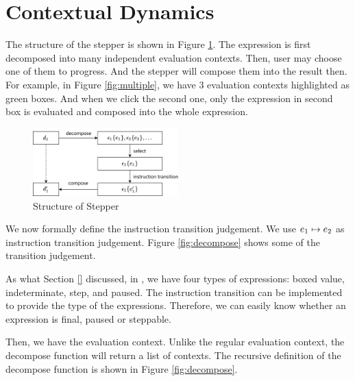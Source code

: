 \section{Contextual Dynamics}
\label{sec:condy}


The structure of the stepper is shown in Figure \ref{fig:structure}. The expression is first decomposed into many independent evaluation contexts. Then, user may choose one of them to progress. And the stepper will compose them into the result then. For example, in Figure \ref{fig:multiple}, we have 3 evaluation contexts highlighted as green boxes. And when we click the second one, only the expression in second box is evaluated and composed into the whole expression.

\begin{figure}[htbp]
  \centering
  \includegraphics[width=0.5\textwidth]{img/struct.png}
  \caption{Structure of Stepper}
  \label{fig:structure}
\end{figure}

We now formally define the instruction transition judgement. We use $e_1 \mapsto e_2$ as instruction transition judgement. Figure \ref{fig:decompose} shows some of the transition judgement.

As what Section \ref{} discussed, in \Hazel, we have four types of expressions: boxed value, indeterminate, step, and paused. The instruction transition can be implemented to provide the type of the expressions. Therefore, we can easily know whether an expression is final, paused or steppable.

Then, we have the evaluation context. Unlike the regular evaluation context, the decompose function will return a list of contexts. The recursive definition of the decompose function is shown in Figure \ref{fig:decompose}.

